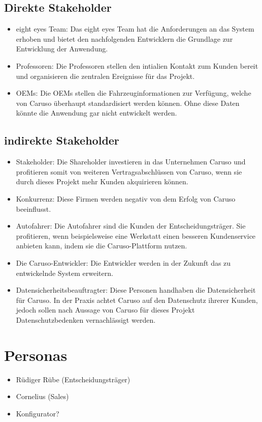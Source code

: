 \subsection{Direkte Stakeholder}
\begin{itemize}
  \item eight eyes Team: Das eight eyes Team hat die Anforderungen an das System erhoben und bietet den nachfolgenden Entwicklern die Grundlage zur Entwicklung der Anwendung.
  \item Professoren: Die Professoren stellen den intialien Kontakt zum Kunden bereit und organisieren die zentralen Ereignisse für das Projekt.
  \item OEMs: Die OEMs stellen die Fahrzeuginformationen zur Verfügung, welche von Caruso überhaupt standardisiert werden können. Ohne diese Daten könnte die Anwendung gar nicht entwickelt werden.
\end{itemize}
\subsection{indirekte Stakeholder}
\begin{itemize}
  \item Stakeholder: Die Shareholder investieren in das Unternehmen Caruso und profitieren somit von weiteren Vertragsabschlüssen von Caruso, wenn sie durch dieses Projekt mehr Kunden akquirieren können.
  \item Konkurrenz: Diese Firmen werden negativ von dem Erfolg von Caruso beeinflusst.
  \item Autofahrer: Die Autofahrer sind die Kunden der Entscheidungsträger. Sie profitieren, wenn beispielsweise eine Werkstatt einen besseren Kundenservice anbieten kann, indem sie die Caruso-Plattform nutzen.
  \item Die Caruso-Entwickler: Die Entwickler werden in der Zukunft das zu entwickelnde System erweitern.
  \item Datensicherheitsbeauftragter: Diese Personen handhaben die Datensicherheit für Caruso. In der Praxis achtet Caruso auf den Datenschutz ihrerer Kunden, jedoch sollen nach Aussage von Caruso für dieses Projekt Datenschutzbedenken vernachlässigt werden.
\end{itemize}

\section{Personas}
\begin{itemize}
  \item Rüdiger Rübe (Entscheidungsträger)
  \item Cornelius (Sales)
  \item Konfigurator?
\end{itemize}